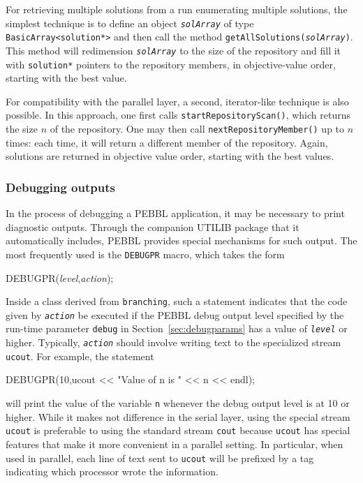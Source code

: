 For retrieving multiple solutions from a run enumerating multiple
solutions, the simplest technique is to define an object
\texttt{\emph{solArray}} of type \texttt{BasicArray<solution*>} and
then call the method \texttt{getAllSolutions(\emph{solArray})}.  This
method will redimension \texttt{\emph{solArray}} to the size of the
repository and fill it with \texttt{solution*} pointers to the
repository members, in objective-value order, starting with the best
value.

For compatibility with the parallel layer, a second, iterator-like
technique is also possible.  In this approach, one first calls
\texttt{startRepositoryScan()}, which returns the size $n$ of the
repository.  One may then call \texttt{nextRepositoryMember()} up to
$n$ times: each time, it will return a different member of the
repository.  Again, solutions are returned in objective value order,
starting with the best values.

\subsubsection{Debugging outputs}
In the process of debugging a PEBBL application, it may be necessary
to print diagnostic outputs.  Through the companion UTILIB package
that it automatically includes, PEBBL provides special mechanisms for
such output.  The most frequently used is the \texttt{DEBUGPR} macro,
which takes the form
\begin{codeblock}
DEBUGPR(\textit{level},\textit{action});
\end{codeblock}
Inside a class derived from \texttt{branching}, such a statement
indicates that the code given by \texttt{\textit{action}} be executed
if the PEBBL debug output level specified by the run-time parameter
\texttt{debug} in Section~\ref{sec:debugparams} has a value of
\texttt{\textit{level}} or higher.  Typically,
\texttt{\textit{action}} should involve writing text to the
specialized stream \texttt{ucout}.  For example, the statement
\begin{codeblock}
DEBUGPR(10,ucout << "Value of n is " << n << endl);
\end{codeblock}
will print the value of the variable \texttt{n} whenever the debug output
level is at 10 or higher.  While it makes not difference in the serial
layer, using the special stream \texttt{ucout} is preferable to using
the standard stream \texttt{cout} because \texttt{ucout} has special
features that make it more convenient in a parallel setting.  In
particular, when used in parallel, each line of text sent to
\texttt{ucout} will be prefixed by a tag indicating which processor
wrote the information.

